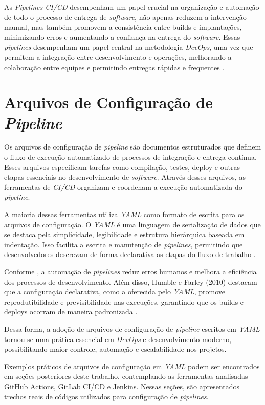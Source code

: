 As \textit{Pipelines CI/CD} desempenham um papel crucial na organização e automação de todo o processo de entrega de \textit{software}, não apenas reduzem a intervenção manual, mas também promovem a consistência entre builds e implantações, minimizando erros e aumentando a confiança na entrega do \textit{software}. Essas \textit{pipelines} desempenham um papel central na metodologia \textit{DevOps}, uma vez que permitem a integração entre desenvolvimento e operações, melhorando a colaboração entre equipes e permitindo entregas rápidas e frequentes \cite{Humble2010}.

\section{Arquivos de Configuração de \textit{Pipeline}}

Os arquivos de configuração de \textit{pipeline} são documentos estruturados que definem o fluxo de execução automatizado de processos de integração e entrega contínua. Esses arquivos especificam tarefas como compilação, testes, deploy e outras etapas essenciais no desenvolvimento de \textit{software}. Através desses arquivos, as ferramentas de \textit{CI/CD} organizam e coordenam a execução automatizada do \textit{pipeline}.

A maioria dessas ferramentas utiliza \textit{YAML} como formato de escrita para os arquivos de configuração. O \textit{YAML} é uma linguagem de serialização de dados que se destaca pela simplicidade, legibilidade e estrutura hierárquica baseada em indentação. Isso facilita a escrita e manutenção de \textit{pipelines}, permitindo que desenvolvedores descrevam de forma declarativa as etapas do fluxo de trabalho \cite{RedHat2023}.

Conforme \cite{Bass2020}, a automação de \textit{pipelines} reduz erros humanos e melhora a eficiência dos processos de desenvolvimento. Além disso, Humble e Farley (2010) destacam que a configuração declarativa, como a oferecida pelo \textit{YAML}, promove reprodutibilidade e previsibilidade nas execuções, garantindo que os builds e deploys ocorram de maneira padronizada \cite{Humble2010}.

Dessa forma, a adoção de arquivos de configuração de \textit{pipeline} escritos em \textit{YAML} tornou-se uma prática essencial em \textit{DevOps} e desenvolvimento moderno, possibilitando maior controle, automação e escalabilidade nos projetos.

Exemplos práticos de arquivos de configuração em \textit{YAML} podem ser encontrados em seções posteriores deste trabalho, contemplando as ferramentas analisadas — \hyperref[codigo:codigoGithub]{GitHub Actions}, \hyperref[codigo:codigoGitlab]{GitLab CI/CD} e \hyperref[codigo:codigoJenkins]{Jenkins}. Nessas seções, são apresentados trechos reais de códigos utilizados para configuração de \textit{pipelines}.

